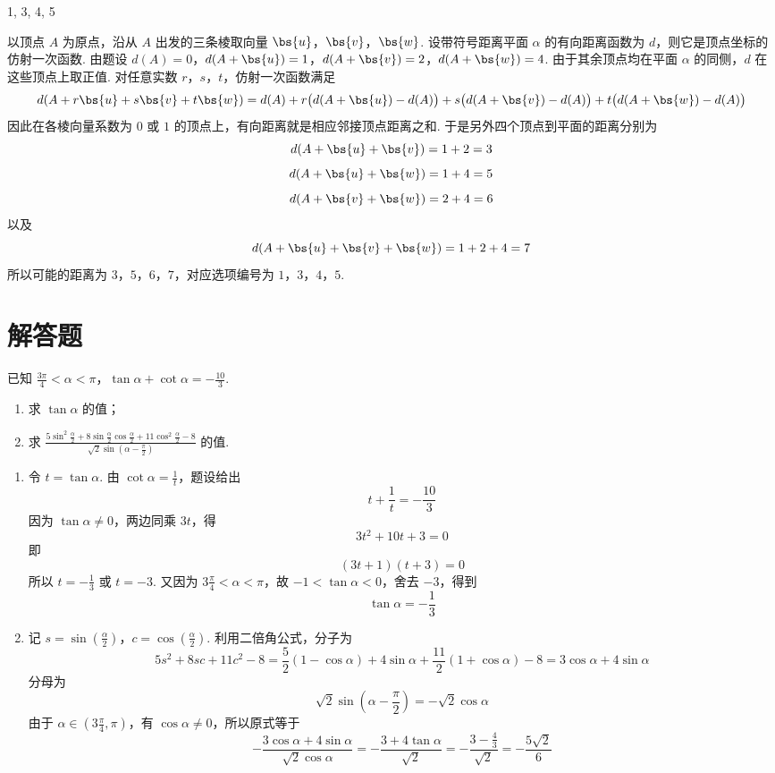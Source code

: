 \begin{answer}
1, 3, 4, 5
\end{answer}

\begin{solution}
以顶点 \(A\) 为原点，沿从 \(A\) 出发的三条棱取向量 \(\bs{u}\)，\(\bs{v}\)，\(\bs{w}\). 设带符号距离平面 \(\alpha\) 的有向距离函数为 \(d\)，则它是顶点坐标的仿射一次函数. 由题设
\(d(A)=0\)，\(d(A+\bs{u})=1\)，\(d(A+\bs{v})=2\)，\(d(A+\bs{w})=4\).
由于其余顶点均在平面 \(\alpha\) 的同侧，\(d\) 在这些顶点上取正值. 对任意实数 \(r\)，\(s\)，\(t\)，仿射一次函数满足
\[
d(A+r\bs{u}+s\bs{v}+t\bs{w})
=d(A)+r\bigl(d(A+\bs{u})-d(A)\bigr)
+s\bigl(d(A+\bs{v})-d(A)\bigr)
+t\bigl(d(A+\bs{w})-d(A)\bigr)
\]
因此在各棱向量系数为 \(0\) 或 \(1\) 的顶点上，有向距离就是相应邻接顶点距离之和. 于是另外四个顶点到平面的距离分别为
\[
d(A+\bs{u}+\bs{v})=1+2=3
\]
\[
d(A+\bs{u}+\bs{w})=1+4=5
\]
\[
d(A+\bs{v}+\bs{w})=2+4=6
\]
以及
\[
d(A+\bs{u}+\bs{v}+\bs{w})=1+2+4=7
\]
所以可能的距离为 \(3\)，\(5\)，\(6\)，\(7\)，对应选项编号为 \(1\)，\(3\)，\(4\)，\(5\).
\end{solution}

\section{解答题}
\begin{problem}
已知 \(\frac{3\pi}{4} < \alpha < \pi\)，\(\tan \alpha + \cot \alpha = -\frac{10}{3}\).

\begin{enumerate}
\item 求 \(\tan \alpha\) 的值；
\item 求 \(\frac{5\sin^{2}\frac{\alpha}{2}+8\sin\frac{\alpha}{2}\cos\frac{\alpha}{2}+11\cos^{2}\frac{\alpha}{2}-8}{\sqrt{2}\sin\left(\alpha-\frac{\pi}{2}\right)}\) 的值.
\end{enumerate}
\end{problem}

\begin{solution}
\begin{enumerate}
\item 令 \(t=\tan\alpha\). 由 \(\cot\alpha=\frac{1}{t}\)，题设给出
\[
t+\frac1t=-\frac{10}{3}
\]
因为 \(\tan\alpha\neq0\)，两边同乘 \(3t\)，得
\[
3t^2+10t+3=0
\]
即
\[
(3t+1)(t+3)=0
\]
所以 \(t=-\frac{1}{3}\) 或 \(t=-3\). 又因为 \(3\frac{\pi}{4}<\alpha<\pi\)，故 \(-1<\tan\alpha<0\)，舍去 \(-3\)，得到
\[
\tan\alpha=-\frac13
\]

\item 记 \(s=\sin(\frac{\alpha}{2})\)，\(c=\cos(\frac{\alpha}{2})\). 利用二倍角公式，分子为
\[
5s^2+8sc+11c^2-8
=\frac52(1-\cos\alpha)+4\sin\alpha+\frac{11}{2}(1+\cos\alpha)-8
=3\cos\alpha+4\sin\alpha
\]
分母为
\[
\sqrt2\sin\left(\alpha-\frac\pi2\right)=-\sqrt2\cos\alpha
\]
由于 \(\alpha\in(3\frac{\pi}{4},\pi)\)，有 \(\cos\alpha\neq0\)，所以原式等于
\[
-\frac{3\cos\alpha+4\sin\alpha}{\sqrt2\cos\alpha}
=-\frac{3+4\tan\alpha}{\sqrt2}
=-\frac{3-\frac{4}{3}}{\sqrt2}
=-\frac{5\sqrt2}{6}
\]
\end{enumerate}
\end{solution}

